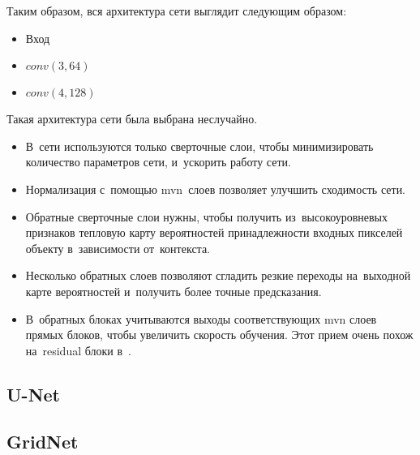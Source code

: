 Таким образом, вся архитектура сети выглядит следующим образом:

\begin{itemize}
  \item Вход
  \item $conv(3,64)$
  \item $conv(4,128)$
\end{itemize}

Такая архитектура сети была выбрана неслучайно.

\begin{itemize}
	\item В~сети используются только сверточные слои, чтобы минимизировать количество параметров сети, и~ускорить работу сети.
	\item Нормализация с~помощью mvn~слоев позволяет улучшить сходимость сети.
	\item Обратные сверточные слои нужны, чтобы получить из~высокоуровневых признаков тепловую карту вероятностей принадлежности входных пикселей объекту в~зависимости от~контекста.
	\item Несколько обратных слоев позволяют сгладить резкие переходы на~выходной карте вероятностей и~получить более точные предсказания.
	\item В~обратных блоках учитываются выходы соответствующих mvn слоев прямых блоков, чтобы увеличить скорость обучения. Этот прием очень похож на~residual блоки в~\cite{resnet}.
 \end{itemize}

\subsection{U-Net}

\subsection{GridNet}
